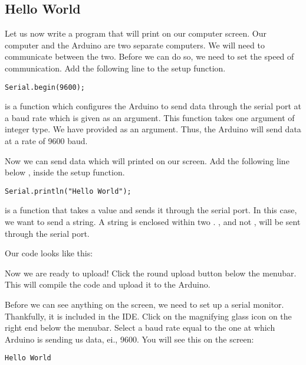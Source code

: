 \documentclass{article}
\begin{document}
	\subsection{Hello World}
		Let us now write a program that will print  on our computer screen. Our computer and the Arduino are two separate computers. We will need to communicate between the two. Before we can do so, we need to set the speed of communication. Add the following line to the setup function.

		\begin{lstlisting}[gobble=8, firstnumber = 3]
		Serial.begin(9600);
		\end{lstlisting}

		 is a function which configures the Arduino to send data through the serial port at a baud rate which is given as an argument. This function takes one argument of integer type. We have provided  as an argument. Thus, the Arduino will send data at a rate of 9600 baud.

		Now we can send data which will printed on our screen. Add the following line below , inside the setup function.

		\begin{lstlisting}[gobble=8, firstnumber = 4]
		Serial.println("Hello World");
		\end{lstlisting}

		 is a function that takes a value and sends it through the serial port. In this case, we want to send a string. A string is enclosed within two . , and not , will be sent through the serial port.

		Our code looks like this:

		

		Now we are ready to upload! Click the round upload button below the menubar. This will compile the code and upload it to the Arduino.

		Before we can see anything on the screen, we need to set up a serial monitor. Thankfully, it is included in the IDE. Click on the magnifying glass icon on the right end below the menubar. Select a baud rate equal to the one at which Arduino is sending us data, ei., 9600. You will see this on the screen:

		\begin{lstlisting}[gobble=8]
		Hello World
		\end{lstlisting}
\end{document}
